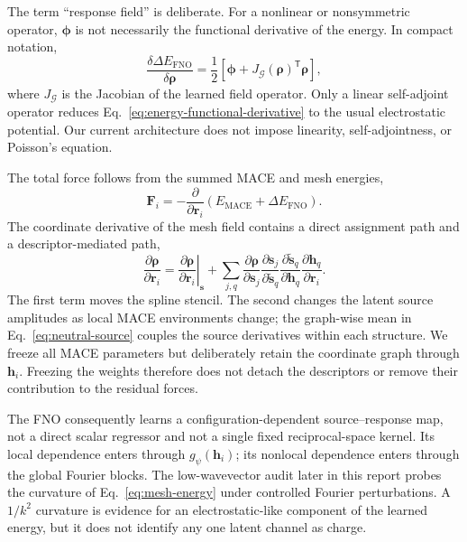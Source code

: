 \documentclass[11pt]{article}
\begin{document}
The term ``response field'' is deliberate. For a nonlinear or nonsymmetric
operator, \(\boldsymbol\phi\) is not necessarily the functional derivative of
the energy. In compact notation,
\begin{equation}
 \frac{\delta\Delta E_{\mathrm{FNO}}}{\delta\boldsymbol\rho}
 =\frac{1}{2}\left[
 \boldsymbol\phi+
 J_{\mathcal G}(\boldsymbol\rho)^{\mathsf T}\boldsymbol\rho
 \right],
 \label{eq:energy-functional-derivative}
\end{equation}
where \(J_{\mathcal G}\) is the Jacobian of the learned field operator. Only a
linear self-adjoint operator reduces Eq.~\eqref{eq:energy-functional-derivative}
to the usual electrostatic potential. Our current architecture does not impose
linearity, self-adjointness, or Poisson's equation.

The total force follows from the summed MACE and mesh energies,
\begin{equation}
 \mathbf F_i=-\frac{\partial}{\partial\mathbf r_i}
 \left(E_{\mathrm{MACE}}+\Delta E_{\mathrm{FNO}}\right).
 \label{eq:total-force}
\end{equation}
The coordinate derivative of the mesh field contains a direct assignment path
and a descriptor-mediated path,
\begin{equation}
 \frac{\partial\boldsymbol\rho}{\partial\mathbf r_i}
 =\left.\frac{\partial\boldsymbol\rho}{\partial\mathbf r_i}\right|_{\mathbf s}
 +\sum_{j,q}
 \frac{\partial\boldsymbol\rho}{\partial\mathbf s_j}
 \frac{\partial\mathbf s_j}{\partial\widetilde{\mathbf s}_q}
 \frac{\partial\widetilde{\mathbf s}_q}{\partial\mathbf h_q}
 \frac{\partial\mathbf h_q}{\partial\mathbf r_i}.
 \label{eq:force-paths}
\end{equation}
The first term moves the spline stencil. The second changes the latent source
amplitudes as local MACE environments change; the graph-wise mean in
Eq.~\eqref{eq:neutral-source} couples the source derivatives within each
structure. We freeze all MACE parameters but deliberately retain the
coordinate graph through \(\mathbf h_i\). Freezing the weights therefore
does not detach the descriptors or remove their contribution to the residual
forces.

The FNO consequently learns a configuration-dependent source--response map,
not a direct scalar regressor and not a single fixed reciprocal-space kernel.
Its local dependence enters through \(g_\psi(\mathbf h_i)\); its nonlocal
dependence enters through the global Fourier blocks. The low-wavevector audit
later in this report probes the curvature of Eq.~\eqref{eq:mesh-energy} under
controlled Fourier perturbations. A \(1/k^2\) curvature is evidence for an
electrostatic-like component of the learned energy, but it does not identify
any one latent channel as charge.
\end{document}

